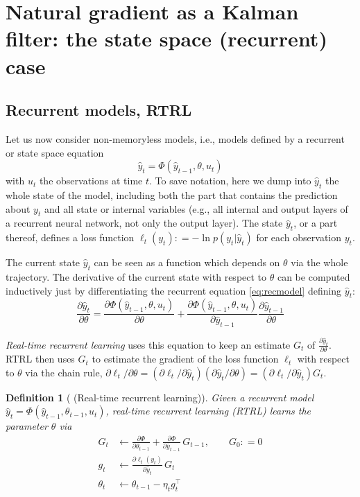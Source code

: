 \documentclass[11pt,a4paper]{article}
\newcommand{\deq}{\mathrel{\mathop{:}}=}
\newcommand{\1}{\mathbbm{1}}
\theoremstyle{yannthm}
\newtheorem{defi}{Definition}
\theoremstyle{yannthm2}
\newcommand{\transp}[1]{#1^{\!\top}\!}
\newcommand{\transf}{\Phi}
\numberwithin{equation}{section}
\begin{document}
\section{Natural gradient as a Kalman filter: the state space (recurrent)
case}
\label{sec:rec}

\subsection{Recurrent models, RTRL}

Let us now consider non-memoryless models, i.e., models defined by a
recurrent or state space equation
\begin{equation}
\label{eq:recmodel}
\hat y_t=\transf(\hat y_{t-1},\theta,u_t)
\end{equation}
with $u_t$ the observations at time $t$.
To save notation, here we dump into $\hat y_t$ the whole state of the
model, including both the part that contains the prediction about $y_t$
and all state or internal variables (e.g.,
all internal and output layers of a recurrent neural network, not only
the output layer). The state $\hat y_t$, or a part
thereof, defines a loss function $\ell_t(y_t)\deq -\ln p(y_t|\hat y_t)$ for each
observation $y_t$.


The current state $\hat y_t$ can be seen as a function which
depends on $\theta$ via the whole trajectory. The derivative of the
current state with respect to $\theta$ can be computed inductively just
by differentiating the recurrent equation \eqref{eq:recmodel} defining $\hat y_t$:
\begin{equation}
\frac{\partial \hat y_t}{\partial \theta}=\frac{\partial \transf(\hat
y_{t-1},\theta,u_t)}{\partial \theta}+\frac{\partial \transf(\hat
y_{t-1},\theta,u_t)}{\partial \hat y_{t-1}}\frac{\partial \hat
y_{t-1}}{\partial \theta}
\end{equation}

\emph{Real-time recurrent learning} \cite{Jaeger_tutorial} uses this equation to keep an estimate
$G_t$ of $\frac{\partial \hat y_t}{\partial \theta}$. 
RTRL then
uses $G_t$ to estimate the gradient of the loss function $\ell_t$ with
respect to $\theta$ via the chain rule, $\partial \ell_t/\partial
\theta=(\partial \ell_t/\partial \hat y_t) (\partial \hat y_t/\partial
\theta)=(\partial \ell_t/\partial \hat y_t) G_t$.

\begin{defi}[ (Real-time recurrent learning)]
Given a recurrent model $\hat y_t = \transf(\hat
y_{t-1},\theta_{t-1},u_t)$, real-time recurrent learning (RTRL) learns the
parameter $\theta$ via
\begin{align}
\label{eq:rtrl}
G_t &\gets \frac{\partial
\transf}{\partial \theta_{t-1}}+\frac{\partial \transf}{\partial \hat
y_{t-1}}\,G_{t-1},
\qquad G_0\deq 0
\\g_t &\gets \frac{\partial \ell_t (y_t)}{\partial\hat y_t} \, G_t
\\\theta_t &\gets \theta_{t-1} - \eta_t \transp{g_t}
\end{align}
\end{defi}
\end{document}
